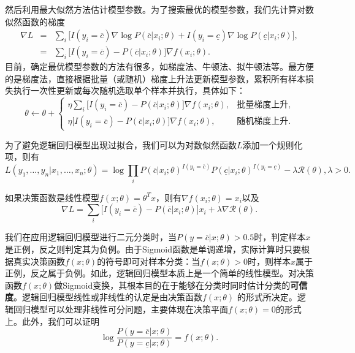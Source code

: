 然后利用最大似然方法估计模型参数。为了搜索最优的模型参数，我们先计算对数似然函数的梯度
\begin{equation}
    \begin{array}{lll}
        \nabla L & = & \sum\limits_i \big[I(y_i=\overline c) \nabla \log P(\overline c|x_i;\theta) + I(y_i=\underline c) \nabla \log P(\underline c|x_i;\theta) \big],\\
        & = & \sum\limits_i \big[I(y_i=\overline c) - P(\overline c|x_i;\theta)\big]\nabla f(x_i;\theta).
    \end{array}
\end{equation}
目前，确定最优模型参数的方法有很多，如梯度法、牛顿法、拟牛顿法等。最方便的是梯度法，直接根据批量（或随机）梯度上升法更新模型参数，累积所有样本损失执行一次性更新或每次随机选取单个样本并执行，具体如下：
\begin{equation}
    \theta \leftarrow \theta +
    \left\{
        \begin{array}{rl}
            \eta \sum\limits_i \big[I(y_i=\overline c) - P(\overline c|x_i;\theta)\big]\nabla f(x_i;\theta),&\text{批量梯度上升},\\
            \eta \big[I(y_i=\overline c) - P(\overline c|x_i;\theta)\big]\nabla f(x_i;\theta),&\text{随机梯度上升}.
        \end{array}
    \right.
\end{equation}

为了避免逻辑回归模型出现过拟合，我们可以为对数似然函数$L$添加一个规则化项，则有
\[
    L(y_1,\ldots,y_n|x_1,\ldots,x_n;\theta) = \log \prod\limits_i P(\overline c|x_i;\theta)^{I(y_i=\overline c)}P(\underline c|x_i;\theta)^{I(y_i=\underline c)} - \lambda \mathcal R(\theta),\lambda>0.
\]

如果决策函数是线性模型$f(x;\theta) = \theta^T x$，则有$\nabla f(x_i;\theta) = x_i$以及
\[
    \nabla L = \sum\limits_i \big[I(y_i=\overline c) - P(\overline c|x_i;\theta)\big] x_i + \lambda \nabla \mathcal R(\theta).
\]

\begin{remark}
我们在应用逻辑回归模型进行二元分类时，当$P(y=\overline c|x;\theta)>0.5$时，判定样本$x$是正例，反之则判定其为负例。由于Sigmoid函数是单调递增，实际计算时只要根据真实决策函数$f(x;\theta)$的符号即可对样本分类：当$f(x;\theta)>0$时，则样本$x$属于正例，反之属于负例。如此，逻辑回归模型本质上是一个简单的线性模型。对决策函数$f(x;\theta)$做Sigmoid变换，其根本目的在于能够在分类时同时估计分类的\textbf{可信度}。逻辑回归模型线性或非线性的认定是由决策函数$f(x;\theta)$ 的形式所决定。逻辑回归模型可以处理非线性可分问题，主要体现在决策平面$f(x;\theta)=0$的形式上。此外，我们可以证明
\[
    \log \frac{P(y=\overline c|x;\theta)}{P(y=\underline c|x;\theta)} = f(x;\theta).
\]
\end{remark}

